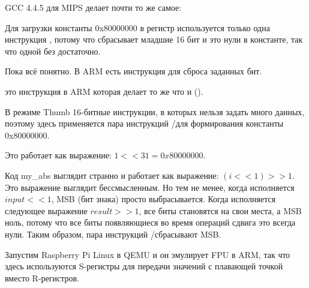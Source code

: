 GCC 4.4.5 для MIPS делает почти то же самое:



Для загрузки константы 0x80000000 в регистр используется только одна инструкция \LUI, потому что \LUI сбрасывает
младшие 16 бит и это нули в константе, так что одной \LUI без \ORI достаточно.


\subsubsectionold{\OptimizingKeilVI (\ARMMode)}



Пока всё понятно.
В ARM есть инструкция \BIC для сброса заданных бит.

\EOR это инструкция в ARM которая делает то же что и \XOR ().

\subsubsectionold{\OptimizingKeilVI (\ThumbMode)}



В режиме Thumb 16-битные инструкции, в которых нельзя задать много данных, поэтому здесь
применяется пара инструкций \MOVS/\LSLS для формирования константы 0x80000000.

Это работает как выражение: $1<<31 = 0x80000000$.

Код my\_abs выглядит странно и работает как выражение: $(i<<1)>>1$.
Это выражение выглядит бессмысленным.
Но тем не менее, когда исполняется $input<<1$, \ac{MSB} (бит знака) просто выбрасывается.
Когда исполняется следующее выражение $result>>1$, все биты становятся на свои места,
а \ac{MSB} ноль, потому что все  биты появляющиеся во время операций сдвига это всегда нули.
Таким образом, пара инструкций \LSLS/\LSRS сбрасывают \ac{MSB}.




Запустим Raspberry Pi Linux в QEMU и он эмулирует FPU в ARM, так что здесь используются S-регистры
для передачи значений с плавающей точкой вместо R-регистров.

